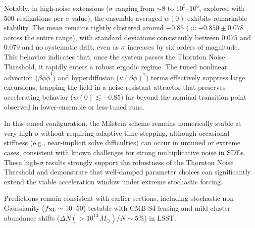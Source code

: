 \documentclass[preprint]{aastex7}
\begin{document}
Notably, in high-noise extensions (\( \sigma \) ranging from $\sim$8 to $10^5$--$10^6$, explored with 500 realizations per \( \sigma \) value), the ensemble-averaged \( w(0) \) exhibits remarkable stability. The mean remains tightly clustered around \( -0.85 \) (\( \approx -0.850 \pm 0.078 \) across the entire range), with standard deviations consistently between $0.075$ and $0.079$ and no systematic drift, even as \( \sigma \) increases by six orders of magnitude. This behavior indicates that, once the system passes the Thornton Noise Threshold, it rapidly enters a robust ergodic regime. The tuned nonlinear advection (\( \beta \phi \dot{\phi}^4 \)) and hyperdiffusion (\( \kappa (\partial \phi)^2 \)) terms effectively suppress large excursions, trapping the field in a noise-resistant attractor that preserves accelerating behavior (\( w(0) \lesssim -0.85 \)) far beyond the nominal transition point observed in lower-ensemble or less-tuned runs.

In this tuned configuration, the Milstein scheme remains numerically stable at very high \( \sigma \) without requiring adaptive time-stepping, although occasional stiffness (e.g., near-implicit solve difficulties) can occur in untuned or extreme cases, consistent with known challenges for strong multiplicative noise in SDEs. These high-\( \sigma \) results strongly support the robustness of the Thornton Noise Threshold and demonstrate that well-damped parameter choices can significantly extend the viable acceleration window under extreme stochastic forcing.

Predictions remain consistent with earlier sections, including stochastic non-Gaussianity (\( f_{\rm NL} \sim 10 \)--50) testable with CMB-S4 lensing and mild cluster abundance shifts (\( \Delta N(>10^{14}\, M_\odot)/N \sim 5\% \)) in LSST.
\end{document}
